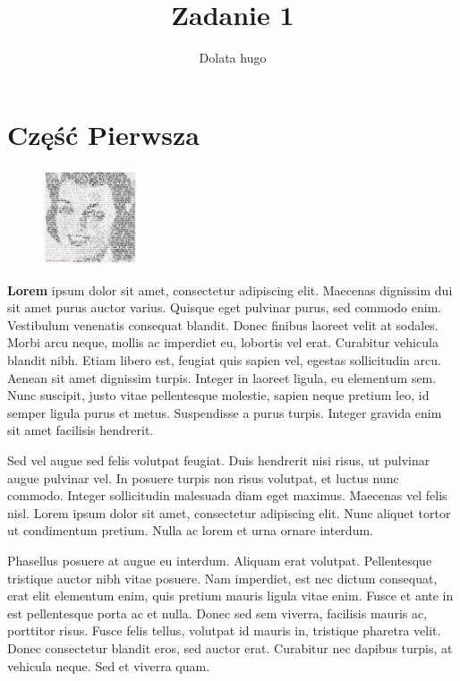 \documentclass[]{article}
\title{Zadanie 1}
\author{Dolata hugo}
\begin{document}
\maketitle

\newpage
\tableofcontents
\newpage
\section{Część Pierwsza}

\begin{figure}
	\centering
	\includegraphics[width=0.25\textwidth]{lorem}
\end{figure}

\textbf{Lorem} \cite{pierwszy} ipsum dolor sit amet, consectetur adipiscing elit. Maecenas dignissim dui sit amet purus auctor varius. Quisque eget pulvinar purus, sed commodo enim. Vestibulum venenatis consequat blandit. Donec finibus laoreet velit at sodales. Morbi arcu neque, mollis ac imperdiet eu, lobortis vel erat. Curabitur vehicula blandit nibh. Etiam libero est, feugiat quis sapien vel, egestas sollicitudin arcu. Aenean sit amet dignissim turpis. Integer in laoreet ligula, eu elementum sem. Nunc suscipit, justo vitae pellentesque molestie, sapien neque pretium leo, id semper ligula purus et metus. Suspendisse a purus turpis. Integer gravida enim sit amet facilisis hendrerit.

Sed vel augue sed felis volutpat feugiat. Duis hendrerit nisi risus, ut pulvinar augue pulvinar vel. In posuere turpis non risus volutpat, et luctus nunc commodo. Integer sollicitudin malesuada diam eget maximus. Maecenas vel felis nisl. Lorem ipsum dolor sit amet, consectetur adipiscing elit. Nunc aliquet tortor ut condimentum pretium. Nulla ac lorem et urna ornare interdum.

Phasellus posuere at augue eu interdum. Aliquam erat volutpat. Pellentesque tristique auctor nibh vitae posuere. Nam imperdiet, est nec dictum consequat, erat elit elementum enim, quis pretium mauris ligula vitae enim. Fusce et ante in est pellentesque porta ac et nulla. Donec sed sem viverra, facilisis mauris ac, porttitor risus. Fusce felis tellus, volutpat id mauris in, tristique pharetra velit. Donec consectetur blandit eros, sed auctor erat. Curabitur nec dapibus turpis, at vehicula neque. Sed et viverra quam.
\end{document}
